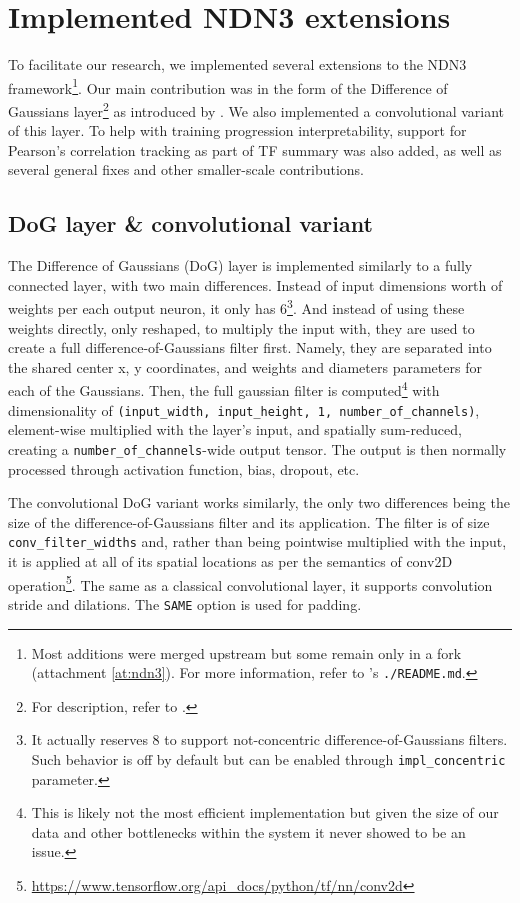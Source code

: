 \section{Implemented NDN3 extensions}\label{ch:3.2}

To facilitate our research, we implemented several extensions to the NDN3 framework\footnote{Most additions were merged upstream but some remain only in a fork (attachment \ref{at:ndn3}). For more information, refer to 's \texttt{./README.md}.}. Our main contribution was in the form of the Difference of Gaussians layer\footnote{For description, refer to .} as introduced by \cite{antolik}. We also implemented a convolutional variant of this layer. To help with training progression interpretability, support for Pearson’s correlation tracking as part of TF summary was also added, as well as several general fixes and other smaller-scale contributions.

\subsection{DoG layer \& convolutional variant}
The Difference of Gaussians (DoG) layer is implemented similarly to a fully connected layer, with two main differences. Instead of input dimensions worth of weights per each output neuron, it only has 6\footnote{It actually reserves 8 to support not-concentric difference-of-Gaussians filters. Such behavior is off by default but can be enabled through \texttt{impl\_concentric} parameter.}. And instead of using these weights directly, only reshaped, to multiply the input with, they are used to create a full difference-of-Gaussians filter first. Namely, they are separated into the shared center x, y coordinates, and weights and diameters parameters for each of the Gaussians. Then, the full gaussian filter is computed\footnote{This is likely not the most efficient implementation but given the size of our data and other bottlenecks within the system it never showed to be an issue.} with dimensionality of \texttt{(input\_width, input\_height, 1, number\_of\_channels)}, element-wise multiplied with the layer’s input, and spatially sum-reduced, creating a \texttt{number\_of\_channels}-wide output tensor. The output is then normally processed through activation function, bias, dropout, etc.

The convolutional DoG variant works similarly, the only two differences being the size of the difference-of-Gaussians filter and its application. The filter is of size \texttt{conv\_filter\_widths} and, rather than being pointwise multiplied with the input, it is applied at all of its spatial locations as per the semantics of conv2D operation\footnote{\href{https://www.tensorflow.org/api_docs/python/tf/nn/conv2d}{https://www.tensorflow.org/api\_docs/python/tf/nn/conv2d}}. The same as a classical convolutional layer, it supports convolution stride and dilations. The \texttt{SAME} option is used for padding. 


